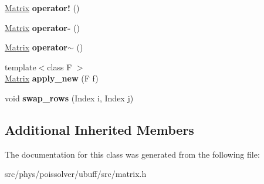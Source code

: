 \begin{DoxyCompactItemize}
\item 
\hyperlink{classcpt_1_1Matrix}{Matrix} {\bfseries operator!} ()\hypertarget{classcpt_1_1Matrix_3_01T_00_011_01_4_ae1bf974879a1de406ef370cbd72959ab}{}\label{classcpt_1_1Matrix_3_01T_00_011_01_4_ae1bf974879a1de406ef370cbd72959ab}

\item 
\hyperlink{classcpt_1_1Matrix}{Matrix} {\bfseries operator-\/} ()\hypertarget{classcpt_1_1Matrix_3_01T_00_011_01_4_aed357de2837fbffe3a402c34bcaee9b9}{}\label{classcpt_1_1Matrix_3_01T_00_011_01_4_aed357de2837fbffe3a402c34bcaee9b9}

\item 
\hyperlink{classcpt_1_1Matrix}{Matrix} {\bfseries operator$\sim$} ()\hypertarget{classcpt_1_1Matrix_3_01T_00_011_01_4_a64e89445e9c86d182050205627d02c70}{}\label{classcpt_1_1Matrix_3_01T_00_011_01_4_a64e89445e9c86d182050205627d02c70}

\item 
{\footnotesize template$<$class F $>$ }\\\hyperlink{classcpt_1_1Matrix}{Matrix} {\bfseries apply\+\_\+new} (F f)\hypertarget{classcpt_1_1Matrix_3_01T_00_011_01_4_aefb8c1679ff52e56c3094cddc6937ef4}{}\label{classcpt_1_1Matrix_3_01T_00_011_01_4_aefb8c1679ff52e56c3094cddc6937ef4}

\item 
void {\bfseries swap\+\_\+rows} (Index i, Index j)\hypertarget{classcpt_1_1Matrix_3_01T_00_011_01_4_a5ae9ce1ae58f38dcdbf856aac96fc0c2}{}\label{classcpt_1_1Matrix_3_01T_00_011_01_4_a5ae9ce1ae58f38dcdbf856aac96fc0c2}

\end{DoxyCompactItemize}
\subsection*{Additional Inherited Members}


The documentation for this class was generated from the following file\+:\begin{DoxyCompactItemize}
\item 
src/phys/poissolver/ubuff/src/matrix.\+h\end{DoxyCompactItemize}
